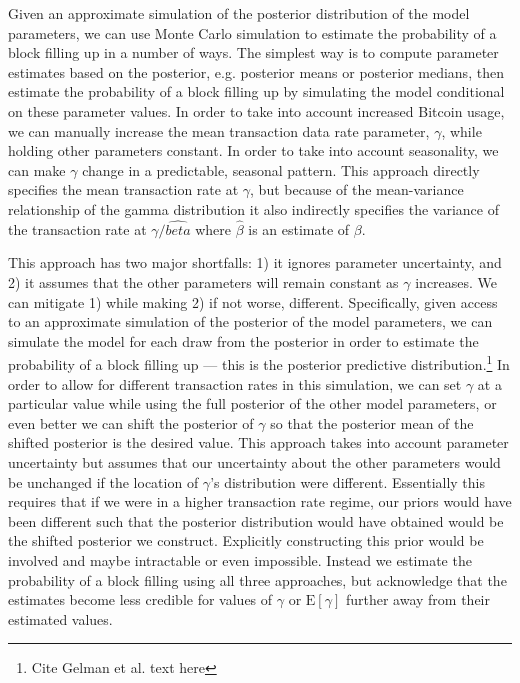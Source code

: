 \documentclass{article}
\begin{document}
Given an approximate simulation of the posterior distribution of the model parameters, we can use Monte Carlo simulation to estimate the probability of a block filling up in a number of ways. The simplest way is to compute parameter estimates based on the posterior, e.g. posterior means or posterior medians, then estimate the probability of a block filling up by simulating the model conditional on these parameter values. In order to take into account increased Bitcoin usage, we can manually increase the mean transaction data rate parameter, $\gamma$, while holding other parameters constant. In order to take into account seasonality, we can make $\gamma$ change in a predictable, seasonal pattern. This approach directly specifies the mean transaction rate at $\gamma$, but because of the mean-variance relationship of the gamma distribution it also indirectly specifies the variance of the transaction rate at $\gamma/\hat{beta}$ where $\hat{\beta}$ is an estimate of $\beta$.

This approach has two major shortfalls: 1) it ignores parameter uncertainty, and 2) it assumes that the other parameters will remain constant as $\gamma$ increases. We can mitigate 1) while making 2) if not worse, different. Specifically, given access to an approximate simulation of the posterior of the model parameters, we can simulate the model for each draw from the posterior in order to estimate the probability of a block filling up --- this is the posterior predictive distribution.\footnote{Cite Gelman et al. text here} In order to allow for different transaction rates in this simulation, we can set $\gamma$ at a particular value while using the full posterior of the other model parameters, or even better we can shift the posterior of $\gamma$ so that the posterior mean of the shifted posterior is the desired value. This approach takes into account parameter uncertainty but assumes that our uncertainty about the other parameters would be unchanged if the location of $\gamma$'s distribution were different. Essentially this requires that if we were in a higher transaction rate regime, our priors would have been different such that the posterior distribution would have obtained would be the shifted posterior we construct. Explicitly constructing this prior would be involved and maybe intractable or even impossible. Instead we estimate the probability of a block filling using all three approaches, but acknowledge that the estimates become less credible for values of $\gamma$ or $\mathrm{E}[\gamma]$ further away from their estimated values.
\end{document}
